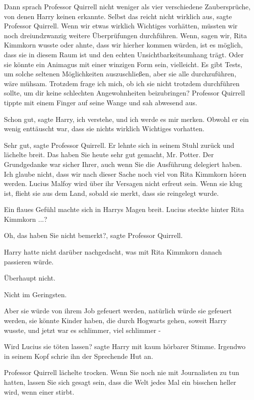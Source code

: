 Dann sprach Professor Quirrell nicht weniger als vier verschiedene
Zaubersprüche, von denen Harry keinen erkannte. \glqq{}Selbst das reicht nicht
wirklich aus\grqq{}, sagte Professor Quirrell. \glqq{}Wenn wir etwas wirklich
Wichtiges vorhätten, müssten wir noch dreiundzwanzig weitere Überprüfungen
durchführen. Wenn, sagen wir, Rita Kimmkorn wusste oder ahnte, dass wir hierher
kommen würden, ist es möglich, dass sie in diesem Raum ist und den echten
Unsichtbarkeitsumhang trägt. Oder sie könnte ein Animagus mit einer winzigen
Form sein, vielleicht. Es gibt Tests, um solche seltenen Möglichkeiten
auszuschließen, aber sie alle durchzuführen, wäre mühsam. Trotzdem frage ich
mich, ob ich sie nicht trotzdem durchführen sollte, um dir keine schlechten
Angewohnheiten beizubringen?\grqq{} Professor Quirrell tippte mit einem Finger
auf seine Wange und sah abwesend aus.

\glqq{}Schon gut\grqq{}, sagte Harry, \glqq{}ich verstehe, und ich werde es mir
merken.\grqq{} Obwohl er ein wenig enttäuscht war, dass sie nichts wirklich
Wichtiges vorhatten.

\glqq{}Sehr gut\grqq{}, sagte Professor Quirrell. Er lehnte sich in seinem Stuhl
zurück und lächelte breit. \glqq{}Das haben Sie heute sehr gut gemacht, Mr.
Potter. Der Grundgedanke war sicher Ihrer, auch wenn Sie die Ausführung
delegiert haben. Ich glaube nicht, dass wir nach dieser Sache noch viel von Rita
Kimmkorn hören werden. Lucius Malfoy wird über ihr Versagen nicht erfreut sein.
Wenn sie klug ist, flieht sie aus dem Land, sobald sie merkt, dass sie
reingelegt wurde.\grqq{}

Ein flaues Gefühl machte sich in Harrys Magen breit. \glqq{}Lucius steckte
hinter Rita Kimmkorn ...?\grqq{}

\glqq{}Oh, das haben Sie nicht bemerkt?\grqq{}, sagte Professor Quirrell.

Harry hatte nicht darüber nachgedacht, was mit Rita Kimmkorn danach passieren
würde.

Überhaupt nicht.

Nicht im Geringsten.

Aber sie würde von ihrem Job gefeuert werden, natürlich würde sie gefeuert
werden, sie könnte Kinder haben, die durch Hogwarts gehen, soweit Harry wusste,
und jetzt war es schlimmer, viel schlimmer -

\glqq{}Wird Lucius sie töten lassen?\grqq{} sagte Harry mit kaum hörbarer
Stimme. Irgendwo in seinem Kopf schrie ihn der Sprechende Hut an.

Professor Quirrell lächelte trocken. \glqq{}Wenn Sie noch nie mit Journalisten
zu tun hatten, lassen Sie sich gesagt sein, dass die Welt jedes Mal ein bisschen
heller wird, wenn einer stirbt.\grqq{}

